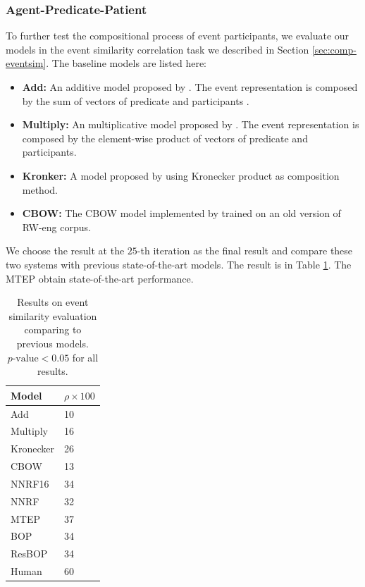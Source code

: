 \documentclass[a4paper]{article}
\begin{document}
\subsubsection{Agent-Predicate-Patient} \label{sec:result-eventsim}
To further test the compositional process of event participants, we evaluate our models in the event similarity correlation task we described in Section \ref{sec:comp-eventsim}. The baseline models are listed here: 
\begin{itemize}
  \item \textbf{Add: } An additive model proposed by \citet{mitchell2008vector}. The event representation is composed by the sum of vectors of predicate and participants . 
  \item \textbf{Multiply: } An multiplicative model proposed by \citet{mitchell2008vector}. The event representation is composed by the element-wise product of vectors of predicate and participants. 
  \item \textbf{Kronker: }  A model proposed by \citet{grefenstette2015concrete} using Kronecker product as composition method. 
  \item \textbf{CBOW: }     The CBOW model implemented by \citet{tilk2016event} trained on an old version of RW-eng corpus.
\end{itemize}
We choose the result at the $25$-th iteration as the final result and compare these two systems with previous state-of-the-art models. The result is in Table \ref{tab:GS}. The MTEP obtain state-of-the-art performance. 

\begin{table}[t]
\centering
\begin{tabular}{l||l}
\textbf{Model}  &   \textbf{$\rho \times 100$}  \\ \hline
Add         &   10    \\
Multiply    &   16    \\
Kronecker   &   26    \\  \hline
CBOW        &   13    \\
NNRF16      &   34    \\  \hline
NNRF        &   32    \\
MTEP        &   37    \\
BOP         &   34    \\
ResBOP      &   34    \\  \hline
Human       &   60    \\
\end{tabular}
\caption{\label{tab:GS} Results on event similarity evaluation comparing to previous models. $p\text{-value} < 0.05$ for all results. }
\end{table}
\end{document}
